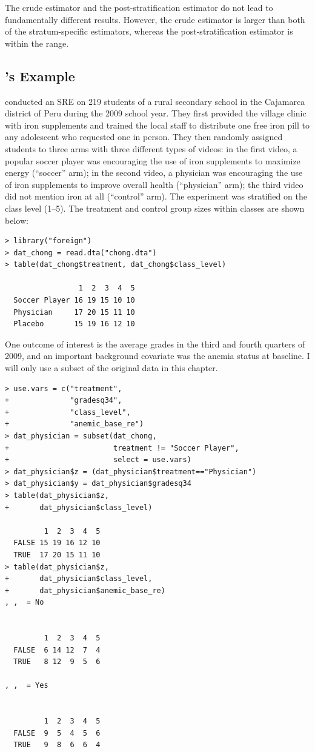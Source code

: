 The crude estimator and the post-stratification estimator do not lead to fundamentally different results.
However, the crude estimator is larger than both of the stratum-specific estimators, whereas the post-stratification estimator is within the range. 


\subsection{\citet{chong2016iron}'s Example}\label{sec::ps-chong}


\citet{chong2016iron} conducted an SRE on   219 students of a rural secondary school in the Cajamarca district of Peru during the 2009 school year. They first provided the village clinic with iron supplements and trained the local staff to distribute one free iron pill to any adolescent who requested one in person. They then randomly assigned students to three arms with three different types of videos: in the first video, a popular soccer player was encouraging the use of iron supplements to maximize energy (``soccer'' arm); in the second video, a physician was encouraging the use of iron supplements to improve overall health (``physician'' arm); the third video did not mention iron at all (``control'' arm). The experiment was stratified on the class level (1--5). The treatment and control group sizes within classes are shown below:

\begin{lstlisting}
> library("foreign")
> dat_chong = read.dta("chong.dta")
> table(dat_chong$treatment, dat_chong$class_level)
               
                 1  2  3  4  5
  Soccer Player 16 19 15 10 10
  Physician     17 20 15 11 10
  Placebo       15 19 16 12 10
\end{lstlisting}

One outcome of interest is the average grades in the third and fourth quarters of 2009, and an important background covariate was the anemia status at baseline. 
I will only use a subset of the original data in this chapter. 

\begin{lstlisting}
> use.vars = c("treatment", 
+              "gradesq34", 
+              "class_level", 
+              "anemic_base_re")
> dat_physician = subset(dat_chong,
+                        treatment != "Soccer Player",
+                        select = use.vars)
> dat_physician$z = (dat_physician$treatment=="Physician")
> dat_physician$y = dat_physician$gradesq34
> table(dat_physician$z, 
+       dat_physician$class_level)
       
         1  2  3  4  5
  FALSE 15 19 16 12 10
  TRUE  17 20 15 11 10
> table(dat_physician$z, 
+       dat_physician$class_level,
+       dat_physician$anemic_base_re)
, ,  = No

       
         1  2  3  4  5
  FALSE  6 14 12  7  4
  TRUE   8 12  9  5  6

, ,  = Yes

       
         1  2  3  4  5
  FALSE  9  5  4  5  6
  TRUE   9  8  6  6  4
\end{lstlisting}

